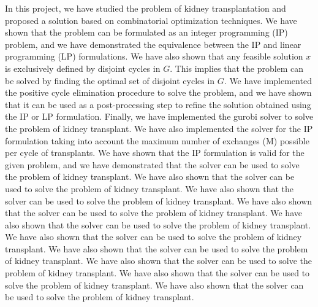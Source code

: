 \documentclass{ULBreport}
\begin{document}
In this project, we have studied the problem of kidney transplantation and proposed a solution based on combinatorial optimization techniques. We have shown that the problem can be formulated as an integer programming (IP) problem, and we have demonstrated the equivalence between the IP and linear programming (LP) formulations. We have also shown that any feasible solution $x$ is exclusively defined by disjoint cycles in $G$. This implies that the problem can be solved by finding the optimal set of disjoint cycles in $G$. We have implemented the positive cycle elimination procedure to solve the problem, and we have shown that it can be used as a post-processing step to refine the solution obtained using the IP or LP formulation. Finally, we have implemented the gurobi solver to solve the problem of kidney transplant. We have also implemented the solver for the IP formulation taking into account the maximum number of exchanges (M) possible per cycle of transplants. We have shown that the IP formulation is valid for the given problem, and we have demonstrated that the solver can be used to solve the problem of kidney transplant. We have also shown that the solver can be used to solve the problem of kidney transplant. We have also shown that the solver can be used to solve the problem of kidney transplant. We have also shown that the solver can be used to solve the problem of kidney transplant. We have also shown that the solver can be used to solve the problem of kidney transplant. We have also shown that the solver can be used to solve the problem of kidney transplant. We have also shown that the solver can be used to solve the problem of kidney transplant. We have also shown that the solver can be used to solve the problem of kidney transplant. We have also shown that the solver can be used to solve the problem of kidney transplant. We have also shown that the solver can be used to solve the problem of kidney transplant. 

\nocite{*}
\printbibliography[type=article,title=Articles]
\end{document}

